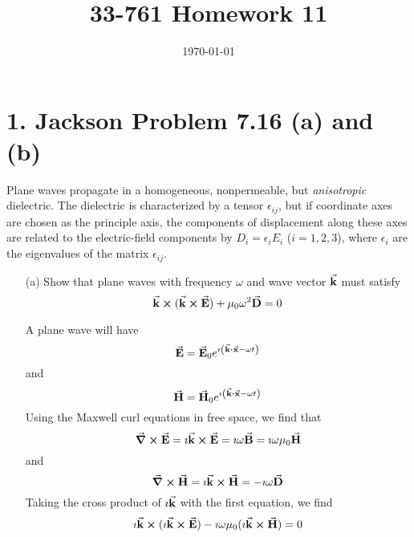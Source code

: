 \documentclass[a4paper,twoside]{article}
\title{33-761 Homework 11}
\date{\today}
\begin{document}
\maketitle

\section*{1. Jackson Problem 7.16 (a) and (b)}
Plane waves propagate in a homogeneous, nonpermeable, but \textit{anisotropic} dielectric. The dielectric is characterized by a tensor $ \epsilon_{ij} $, but if coordinate axes are chosen as the principle axis, the components of displacement along these axes are related to the electric-field components by $ D_i = \epsilon_i E_i $ ($ i = 1,2,3 $), where $ \epsilon_i $ are the eigenvalues of the matrix $ \epsilon_{ij} $.
\begin{itemize}
    \item[(a)] Show that plane waves with frequency $ \omega $ and wave vector $ \va{k} $ must satisfy
        \begin{equation}
            \va{k} \cross ( \va{k} \cross \va{E}) + \mu_0 \omega^2 \va{D} = 0
        \end{equation}
        \begin{problem}
            A plane wave will have
            \begin{equation}
                \va{E} = \va{E}_0 e^{\imath \left( \va{k} \vdot \va{x} - \omega t \right)}
            \end{equation}
            and
            \begin{equation}
                \va{H} = \va{H}_0 e^{\imath \left( \va{k} \vdot \va{x} - \omega t \right)}
            \end{equation}
            Using the Maxwell curl equations in free space, we find that
            \begin{equation}
                \curl{ \va{E}} = \imath \va{k} \cross \va{E} = \imath \omega \va{B} = \imath \omega \mu_0 \va{H}
            \end{equation}
            and
            \begin{equation}
                \curl{ \va{H}} = \imath \va{k} \cross \va{H} = - \imath \omega \va{D}
            \end{equation}
            Taking the cross product of $ \imath \va{k} $ with the first equation, we find
            \begin{equation}
                \imath \va{k} \cross (\imath \va{k} \cross \va{E}) - \imath \omega \mu_0 (\imath \va{k} \cross \va{H}) = 0

\end{equation}
\end{problem}
\end{itemize}
\end{document}
